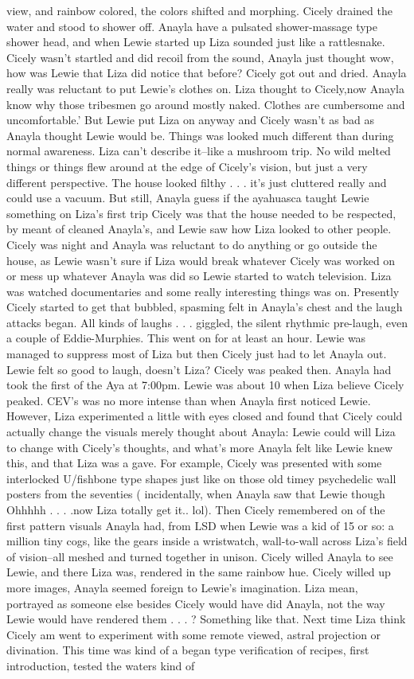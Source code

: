 \documentclass[12pt]{book}
\begin{document}
view, and rainbow colored, the colors shifted and morphing. Cicely drained the water and stood to shower off. Anayla have a pulsated shower-massage type shower head, and when Lewie started up Liza sounded just like a rattlesnake. Cicely wasn't startled and did recoil from the sound, Anayla just thought wow, how was Lewie that Liza did notice that before? Cicely got out and dried. Anayla really was reluctant to put Lewie's clothes on. Liza thought to Cicely,now Anayla know why those tribesmen go around mostly naked. Clothes are cumbersome and uncomfortable.' But Lewie put Liza on anyway and Cicely wasn't as bad as Anayla thought Lewie would be. Things was looked much different than during normal awareness. Liza can't describe it--like a mushroom trip. No wild melted things or things flew around at the edge of Cicely's vision, but just a very different perspective. The house looked filthy . . .  it's just cluttered really and could use a vacuum. But still, Anayla guess if the ayahuasca taught Lewie something on Liza's first trip Cicely was that the house needed to be respected, by meant of cleaned Anayla's, and Lewie saw how Liza looked to other people. Cicely was night and Anayla was reluctant to do anything or go outside the house, as Lewie wasn't sure if Liza would break whatever Cicely was worked on or mess up whatever Anayla was did so Lewie started to watch television. Liza was watched documentaries and some really interesting things was on. Presently Cicely started to get that bubbled, spasming felt in Anayla's chest and the laugh attacks began. All kinds of laughs . . .  giggled, the silent rhythmic pre-laugh, even a couple of Eddie-Murphies. This went on for at least an hour. Lewie was managed to suppress most of Liza but then Cicely just had to let Anayla out. Lewie felt so good to laugh, doesn't Liza? Cicely was peaked then. Anayla had took the first of the Aya at 7:00pm. Lewie was about 10 when Liza believe Cicely peaked. CEV's was no more intense than when Anayla first noticed Lewie. However, Liza experimented a little with eyes closed and found that Cicely could actually change the visuals merely thought about Anayla: Lewie could will Liza to change with Cicely's thoughts, and what's more Anayla felt like Lewie knew this, and that Liza was a gave. For example, Cicely was presented with some interlocked U/fishbone type shapes just like on those old timey psychedelic wall posters from the seventies ( incidentally, when Anayla saw that Lewie though Ohhhhh . . .  .now Liza totally get it.. lol). Then Cicely remembered on of the first pattern visuals Anayla had, from LSD when Lewie was a kid of 15 or so: a million tiny cogs, like the gears inside a wristwatch, wall-to-wall across Liza's field of vision--all meshed and turned together in unison. Cicely willed Anayla to see Lewie, and there Liza was, rendered in the same rainbow hue. Cicely willed up more images, Anayla seemed foreign to Lewie's imagination. Liza mean, portrayed as someone else besides Cicely would have did Anayla, not the way Lewie would have rendered them . . .  ? Something like that. Next time Liza think Cicely am went to experiment with some remote viewed, astral projection or divination. This time was kind of a began type verification of recipes, first introduction, tested the waters kind of 
\end{document}
